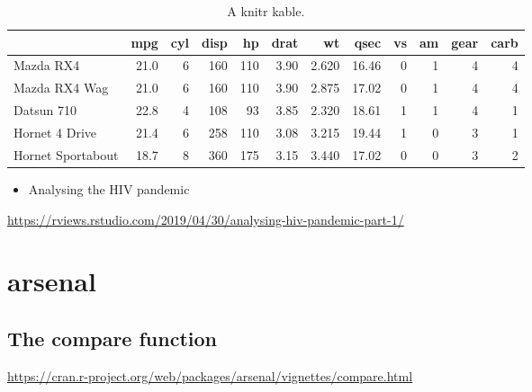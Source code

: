 \documentclass[
]{book}
\providecommand{\tightlist}{%
  \setlength{\itemsep}{0pt}\setlength{\parskip}{0pt}}
\begin{document}
\begin{table}

\caption{\label{tab:unnamed-chunk-18}A knitr kable.}
\centering
\begin{tabular}[t]{l|r|r|r|r|r|r|r|r|r|r|r}
\hline
  & mpg & cyl & disp & hp & drat & wt & qsec & vs & am & gear & carb\\
\hline
Mazda RX4 & 21.0 & 6 & 160 & 110 & 3.90 & 2.620 & 16.46 & 0 & 1 & 4 & 4\\
\hline
Mazda RX4 Wag & 21.0 & 6 & 160 & 110 & 3.90 & 2.875 & 17.02 & 0 & 1 & 4 & 4\\
\hline
Datsun 710 & 22.8 & 4 & 108 & 93 & 3.85 & 2.320 & 18.61 & 1 & 1 & 4 & 1\\
\hline
Hornet 4 Drive & 21.4 & 6 & 258 & 110 & 3.08 & 3.215 & 19.44 & 1 & 0 & 3 & 1\\
\hline
Hornet Sportabout & 18.7 & 8 & 360 & 175 & 3.15 & 3.440 & 17.02 & 0 & 0 & 3 & 2\\
\hline
\end{tabular}
\end{table}

\begin{itemize}
\tightlist
\item
  Analysing the HIV pandemic
\end{itemize}

\url{https://rviews.rstudio.com/2019/04/30/analysing-hiv-pandemic-part-1/}

\hypertarget{arsenal}{%
\chapter{arsenal}\label{arsenal}}

\hypertarget{the-compare-function}{%
\section{The compare function}\label{the-compare-function}}

\url{https://cran.r-project.org/web/packages/arsenal/vignettes/compare.html}
\end{document}
